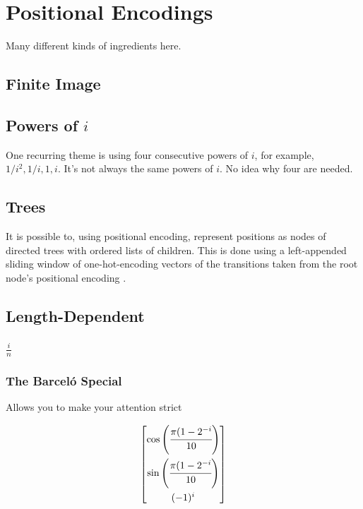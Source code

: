 %
\chapter{Positional Encodings}
%

Many different kinds of ingredients here.

\section{Finite Image}

\section{Powers of $i$}

One recurring theme is using four consecutive powers of $i$, for example, $1/i^2, 1/i, 1, i$. It's not always the same powers of $i$. No idea why four are needed.

\section{Trees}

It is possible to, using positional encoding, represent positions as nodes of directed trees with ordered lists of children.
This is done using a left-appended sliding window of one-hot-encoding vectors of the transitions taken from the root node's positional encoding \citep{shiv2019}.

\section{Length-Dependent}

\subsection{$\frac{i}{n}$}

\subsection{The Barceló Special}

Allows you to make your attention strict 

\[\begin{bmatrix}
    \cos\left(\cfrac{\pi(1-2^{-i}}{10}\right)\\[3ex]
    \sin\left(\cfrac{\pi(1-2^{-i}}{10}\right)\\[3ex]
    (-1)^i
\end{bmatrix}\]